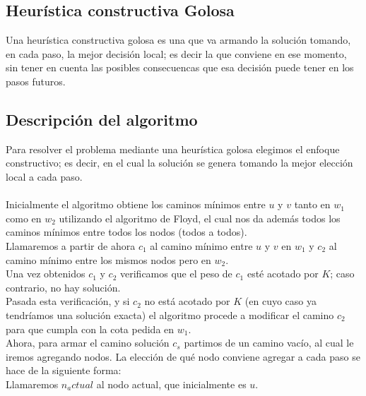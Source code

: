\subsection{Heur\'istica constructiva Golosa}

Una heur\'istica constructiva golosa es una que va armando la soluci\'on tomando, en cada paso, la mejor decisi\'on local; es decir la que conviene en ese momento, sin tener en cuenta las posibles consecuencas que esa decisi\'on puede tener en los pasos futuros.\\

\subsection{Descripci\'on del algoritmo}

Para resolver el problema mediante una heur\'istica golosa elegimos el enfoque constructivo; es decir, en el cual la soluci\'on se genera tomando la mejor elecci\'on local a cada paso.\\\\

Inicialmente el algoritmo obtiene los caminos m\'inimos entre $u$ y $v$ tanto en $w_1$ como en $w_2$ utilizando el algoritmo de Floyd, el cual nos da adem\'as todos los caminos m\'inimos entre todos los nodos (todos a todos).\\
Llamaremos a partir de ahora $c_1$ al camino m\'inimo entre $u$ y $v$ en $w_1$ y $c_2$ al camino m\'inimo entre los mismos nodos pero en $w_2$.\\
Una vez obtenidos $c_1$ y $c_2$ verificamos que el peso de $c_1$ est\'e acotado por $K$; caso contrario, no hay soluci\'on.\\
Pasada esta verificaci\'on, y si $c_2$ no est\'a acotado por $K$ (en cuyo caso ya tendr\'iamos una soluci\'on exacta) el algoritmo procede a modificar el camino $c_2$ para que cumpla con la cota pedida en $w_1$.\\
Ahora, para armar el camino soluci\'on $c_s$ partimos de un camino vac\'io, al cual le iremos agregando nodos. La elecci\'on de qu\'e nodo conviene agregar a cada paso se hace de la siguiente forma:\\
Llamaremos $n_actual$ al nodo actual, que inicialmente es $u$.\\

